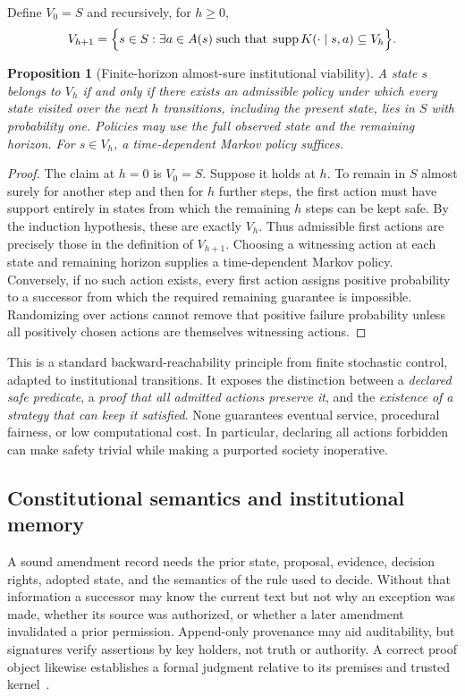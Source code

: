 \documentclass[11pt,letterpaper]{article}
\theoremstyle{plain}
\newtheorem{proposition}{Proposition}[section]
\theoremstyle{definition}
\theoremstyle{remark}
\begin{document}
Define $V_0=S$ and recursively, for $h\ge0$,
\begin{equation}\label{eq:viability}
V_{h+1}=\Bigl\{s\in S:\exists a\in A(s)\;\text{such that}\;
\operatorname{supp}K(\cdot\mid s,a)\subseteq V_h\Bigr\}.
\end{equation}
\begin{proposition}[Finite-horizon almost-sure institutional viability]\label{prop:viability}
A state $s$ belongs to $V_h$ if and only if there exists an admissible policy under which every state visited over the next $h$ transitions, including the present state, lies in $S$ with probability one. Policies may use the full observed state and the remaining horizon. For $s\in V_h$, a time-dependent Markov policy suffices.
\end{proposition}
\begin{proof}
The claim at $h=0$ is $V_0=S$. Suppose it holds at $h$. To remain in $S$ almost surely for another step and then for $h$ further steps, the first action must have support entirely in states from which the remaining $h$ steps can be kept safe. By the induction hypothesis, these are exactly $V_h$. Thus admissible first actions are precisely those in the definition of $V_{h+1}$. Choosing a witnessing action at each state and remaining horizon supplies a time-dependent Markov policy. Conversely, if no such action exists, every first action assigns positive probability to a successor from which the required remaining guarantee is impossible. Randomizing over actions cannot remove that positive failure probability unless all positively chosen actions are themselves witnessing actions.
\end{proof}

This is a standard backward-reachability principle from finite stochastic control, adapted to institutional transitions. It exposes the distinction between a \emph{declared safe predicate}, a \emph{proof that all admitted actions preserve it}, and the \emph{existence of a strategy that can keep it satisfied}. None guarantees eventual service, procedural fairness, or low computational cost. In particular, declaring all actions forbidden can make safety trivial while making a purported society inoperative.

\subsection{Constitutional semantics and institutional memory}

A sound amendment record needs the prior state, proposal, evidence, decision rights, adopted state, and the semantics of the rule used to decide. Without that information a successor may know the current text but not why an exception was made, whether its source was authorized, or whether a later amendment invalidated a prior permission. Append-only provenance may aid auditability, but signatures verify assertions by key holders, not truth or authority. A correct proof object likewise establishes a formal judgment relative to its premises and trusted kernel~\cite{necula}.
\end{document}
